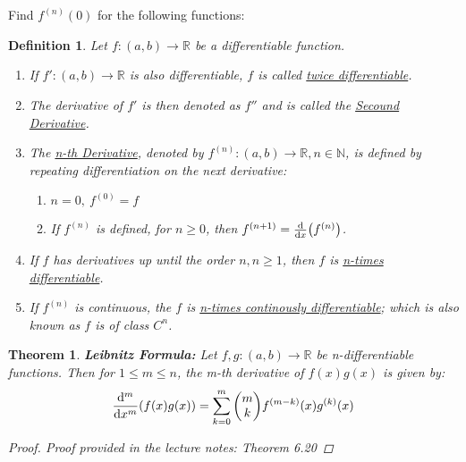 \documentclass[]{article}
\newcommand{\R}{\mathbb{R}}
\newcommand{\N}{\mathbb{N}}
\newtheorem{definition}{Definition}
\newtheorem{theorem}{Theorem}
\begin{document}
\newpage
\section{}
Find $f^{(n)}(0)$ for the following functions:

\begin{definition}
    Let $f : (a,b) \to \R$ be a differentiable function.
    \begin{enumerate}
        \item If $f' : (a,b) \to \R$ is also differentiable, $f$ is called \emph{\underline{twice differentiable}}.
        \item The derivative of $f'$ is then denoted as $f''$ and is called the \emph{\underline{Secound Derivative}}.
        \item The \emph{\underline{n-th Derivative}}, denoted by $f^{(n)} : (a,b) \to \R, n \in \N$, is defined by repeating differentiation on the next derivative:
        \begin{enumerate}
            \item $n = 0, \ f^{(0)} = f$
            \item If $f^{(n)}$ is defined, for $n \geq 0$, then $f^{(n+1)} = \dv{x} (f^{(n)})$.
        \end{enumerate}
        \item If $f$ has derivatives up until the order $n, n \geq 1$, then $f$ is \emph{\underline{n-times differentiable}}.
        \item If $f^{(n)}$ is continuous, the $f$ is \emph{\underline{n-times continously differentiable}}; which is also known as $f$ is of class $C^n$.
    \end{enumerate}
\end{definition}

\begin{theorem}
    \textbf{Leibnitz Formula:}
    Let $f,g : (a,b) \to \R$ be n-differentiable functions. 
    Then for $1\leq m \leq n$, the m-th derivative of $f(x)g(x)$ is given by:
    \[
        \dv[m]{x}\qty(f(x) g(x)) = \sum_{k=0}^m \mqty(m \\ k) f^{(m-k)}(x) g^{(k)}(x)
    \]
    \begin{proof}
        Proof provided in the lecture notes: Theorem 6.20
    \end{proof}
\end{theorem}

\end{document}
